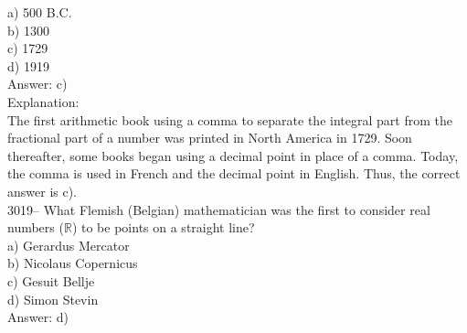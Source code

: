 \documentclass[letterpaper, 12pt]{article}
\begin{document}
a) 500 B.C.\\
b) 1300\\
c) 1729\\
d) 1919\\

Answer: c)\\

Explanation:\\
The first arithmetic book using a comma to separate the integral part from the fractional part of a number was printed in North America in 1729. Soon thereafter, some books began using a decimal point in place of a comma. Today, the comma is used in French and the decimal point in English. Thus, the correct answer is c).\\



3019-- What Flemish (Belgian) mathematician was the first to consider real numbers ($\mathbb{R}$) to be points on a straight line?\\

a) Gerardus Mercator\\
b) Nicolaus Copernicus\\
c) Gesuit Bellje\\
d) Simon Stevin\\

Answer: d)\\
\end{document}
